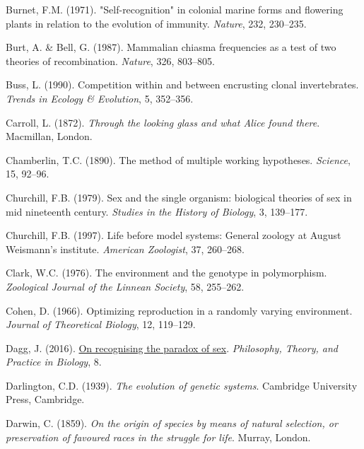 \documentclass[
  letterpaper,
]{book}
\newlength{\cslhangindent}
\newenvironment{CSLReferences}[2] %
 {\begin{list}{}{%
  \setlength{\itemindent}{0pt}
  \setlength{\leftmargin}{0pt}
  \setlength{\parsep}{0pt}
  \ifodd #1
   \setlength{\leftmargin}{\cslhangindent}
   \setlength{\itemindent}{-1\cslhangindent}
  \fi
  \setlength{\itemsep}{#2\baselineskip}}}
 {\end{list}}
\begin{document}
\begin{CSLReferences}{1}{0}
Burnet, F.M. (1971). "Self-recognition" in colonial marine forms and
flowering plants in relation to the evolution of immunity.
\emph{Nature}, 232, 230--235.

Burt, A. \& Bell, G. (1987). Mammalian chiasma frequencies as a test of
two theories of recombination. \emph{Nature}, 326, 803--805.

Buss, L. (1990). Competition within and between encrusting clonal
invertebrates. \emph{Trends in Ecology \& Evolution}, 5, 352--356.

Carroll, L. (1872). \emph{Through the looking glass and what {Alice}
found there}. Macmillan, London.

Chamberlin, T.C. (1890). The method of multiple working hypotheses.
\emph{Science}, 15, 92--96.

Churchill, F.B. (1979). Sex and the single organism: {b}iological
theories of sex in mid nineteenth century. \emph{Studies in the History
of Biology}, 3, 139--177.

Churchill, F.B. (1997). Life before model systems: General zoology at
{August Weismann's} institute. \emph{American Zoologist}, 37, 260--268.

Clark, W.C. (1976). The environment and the genotype in polymorphism.
\emph{Zoological Journal of the Linnean Society}, 58, 255--262.

Cohen, D. (1966). Optimizing reproduction in a randomly varying
environment. \emph{Journal of Theoretical Biology}, 12, 119--129.

Dagg, J. (2016). \href{https://doi.org/10.3998/ptb.6959004.0008.003}{On
recognising the paradox of sex}. \emph{Philosophy, Theory, and Practice
in Biology}, 8.

Darlington, C.D. (1939). \emph{The evolution of genetic systems}.
Cambridge University Press, Cambridge.

Darwin, C. (1859). \emph{On the origin of species by means of natural
selection, or preservation of favoured races in the struggle for life}.
Murray, London.


\end{CSLReferences}
\end{document}
